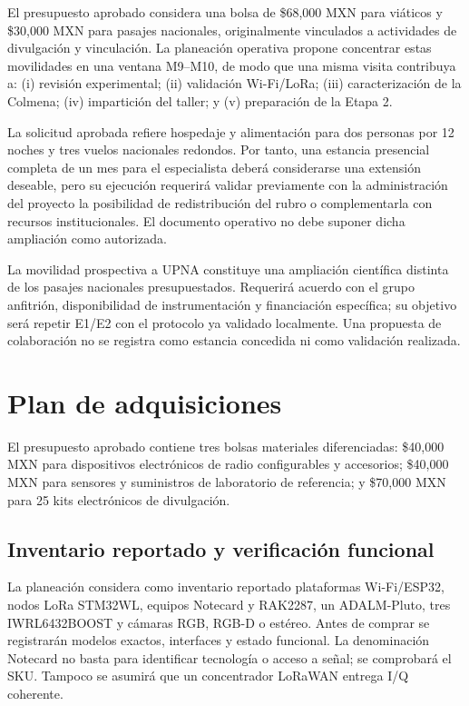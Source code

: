 El presupuesto aprobado considera una bolsa de \$68,000 MXN para viáticos y
\$30,000 MXN para pasajes nacionales, originalmente vinculados a actividades de
divulgación y vinculación. La planeación operativa propone concentrar estas movilidades
en una ventana M9--M10, de modo que una misma visita contribuya a: (i) revisión
experimental; (ii) validación Wi-Fi/LoRa; (iii) caracterización de la Colmena;
(iv) impartición del taller; y (v) preparación de la Etapa 2.

La solicitud aprobada refiere hospedaje y alimentación para dos personas por 12 noches y
tres vuelos nacionales redondos. Por tanto, una estancia presencial completa de un mes
para el especialista deberá considerarse una extensión deseable, pero su ejecución requerirá
validar previamente con la administración del proyecto la posibilidad de redistribución del
rubro o complementarla con recursos institucionales. El documento operativo no debe
suponer dicha ampliación como autorizada.

La movilidad prospectiva a UPNA constituye una ampliación científica distinta de los
pasajes nacionales presupuestados. Requerirá acuerdo con el grupo anfitrión, disponibilidad
de instrumentación y financiación específica; su objetivo será repetir E1/E2 con el
protocolo ya validado localmente. Una propuesta de colaboración no se registra como
estancia concedida ni como validación realizada.

\section{Plan de adquisiciones}

El presupuesto aprobado contiene tres bolsas materiales diferenciadas:
\$40,000 MXN para dispositivos electrónicos de radio configurables y accesorios;
\$40,000 MXN para sensores y suministros de laboratorio de referencia; y
\$70,000 MXN para 25 kits electrónicos de divulgación.


\subsection{Inventario reportado y verificación funcional}

La planeación considera como inventario reportado plataformas Wi-Fi/ESP32, nodos
LoRa STM32WL, equipos Notecard y RAK2287, un ADALM-Pluto, tres IWRL6432BOOST y
cámaras RGB, RGB-D o estéreo. Antes de comprar se registrarán modelos exactos,
interfaces y estado funcional. La denominación Notecard no basta para identificar
tecnología o acceso a señal; se comprobará el SKU. Tampoco se asumirá que un
concentrador LoRaWAN entrega I/Q coherente.

